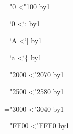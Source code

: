 \ltj@tempcnta="0%
\loop\ifnum\ltj@tempcnta<"100%
  \advance\ltj@tempcnta by1
\repeat

\ltj@tempcnta=`0%
\loop\ifnum\ltj@tempcnta<`:%
  \advance\ltj@tempcnta by1
\repeat

\ltj@tempcnta=`A%
\loop\ifnum\ltj@tempcnta<`[%
  \advance\ltj@tempcnta by1
\repeat

\ltj@tempcnta=`a%
\loop\ifnum\ltj@tempcnta<`\{%
  \advance\ltj@tempcnta by1
\repeat

\ltj@tempcnta="2000%
\loop\ifnum\ltj@tempcnta<"2070%
  \advance\ltj@tempcnta by1
\repeat

\ltj@tempcnta="2500%
\loop\ifnum\ltj@tempcnta<"2580%
  \advance\ltj@tempcnta by1
\repeat

\ltj@tempcnta="3000%
\loop\ifnum\ltj@tempcnta<"3040%
  \advance\ltj@tempcnta by1
\repeat

\ltj@tempcnta="FF00%
\loop\ifnum\ltj@tempcnta<"FFF0%
  \advance\ltj@tempcnta by1
\repeat

